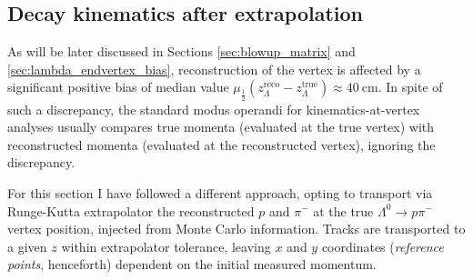 %
%
%


\subsection{Decay kinematics after extrapolation}
\label{sec:3:true_vtx_kinematics}
As will be later discussed in Sections \ref{sec:blowup_matrix} and \ref{sec:lambda_endvertex_bias}, reconstruction of the \lz vertex is affected by a significant positive bias of median value $\mu_\frac{1}{2} \left(z_\Lambda^\text{reco} - z_\Lambda^\text{true}\right) \approx \SI{40}{\centi\meter}$.
In spite of such a discrepancy, the standard modus operandi for kine\-matics-at-vertex analyses usually compares true momenta (evaluated at the true vertex) with reconstructed momenta (evaluated at the reconstructed vertex), ignoring the discrepancy.

For this section I have followed a different approach, opting to transport via Runge-Kutta extrapolator the reconstructed $p$ and $\pi^-$ at the true $\Lambda^0 \rightarrow p\pi^-$ vertex position, injected from Monte Carlo information.
Tracks are transported to a given $z$ within extrapolator tolerance, leaving $x$ and $y$ coordinates (\textit{reference points}, henceforth) dependent on the initial measured momentum.

